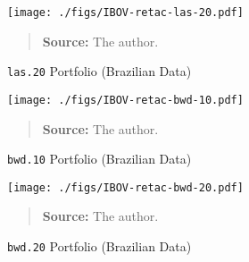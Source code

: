 \documentclass[12pt,oneside,a4paper]{memoir}
\begin{document}


\clearpage






\clearpage

\begin{figure}[htpb]
\centering
\footnotesize
\caption{\texttt{las.20} Portfolio (Brazilian Data)}
\label{fig:ibov:las.20}
\texttt{[image: ./figs/IBOV-retac-las-20.pdf]}
\begin{quote}
\textbf{Source:} The author.
\end{quote}
\end{figure}

\begin{figure}[htpb]
\centering
\footnotesize
\caption{\texttt{bwd.10} Portfolio (Brazilian Data)}
\label{fig:ibov:bwd.10}
\texttt{[image: ./figs/IBOV-retac-bwd-10.pdf]}
\begin{quote}
\textbf{Source:} The author.
\end{quote}
\end{figure}

\begin{figure}[htpb]
\centering
\footnotesize
\caption{\texttt{bwd.20} Portfolio (Brazilian Data)}
\label{fig:ibov:bwd.20}
\texttt{[image: ./figs/IBOV-retac-bwd-20.pdf]}
\begin{quote}
\textbf{Source:} The author.
\end{quote}
\end{figure}



\clearpage







\clearpage
\end{document}
